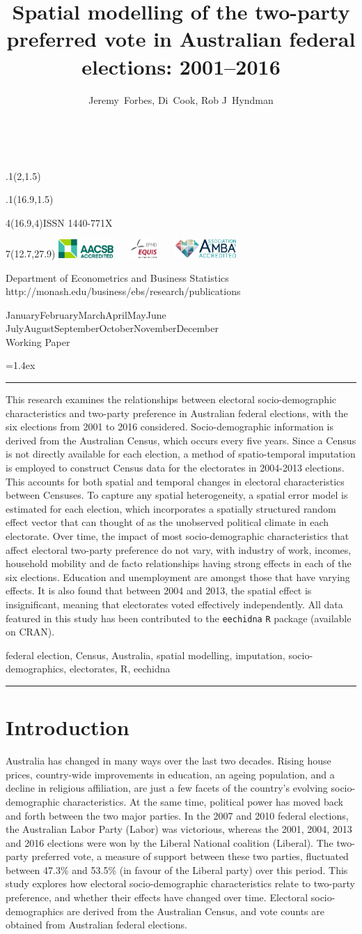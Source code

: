 \documentclass[11pt,a4paper,]{article}
\title{Spatial modelling of the two-party preferred vote in Australian federal elections: 2001--2016}
\author{Jeremy~Forbes, Di~Cook, Rob J~Hyndman}
\date{\sf\Date~\Month~\Year}
\makeatletter
\def\Date{\number\day}
\def\Month{\ifcase\month\or
 January\or February\or March\or April\or May\or June\or
 July\or August\or September\or October\or November\or December\fi}
\def\Year{\number\year}
\def\showjel{{\large\textsf{\textbf{JEL classification:}}~\@jel}}
\def\cover{{\sffamily\setcounter{page}{0}
        \thispagestyle{empty}
        \placefig{2}{1.5}{width=5cm}{monash2}
        \placefig{16.9}{1.5}{width=2.1cm}{MBusSchool}
        \begin{textblock}{4}(16.9,4)ISSN 1440-771X\end{textblock}
        \begin{textblock}{7}(12.7,27.9)\hfill
        \includegraphics[height=0.7cm]{AACSB}~~~
        \includegraphics[height=0.7cm]{EQUIS}~~~
        \includegraphics[height=0.7cm]{AMBA}
        \end{textblock}
        \vspace*{2cm}
        \begin{center}\Large
        Department of Econometrics and Business Statistics\\[.5cm]
        \footnotesize http://monash.edu/business/ebs/research/publications
        \end{center}\vspace{2cm}
        \begin{center}
        \fbox{\parbox{14cm}{\begin{onehalfspace}\centering\Huge\vspace*{0.3cm}
                \textsf{\textbf{\expandafter{\@title}}}\vspace{1cm}\par
                \LARGE\@author\end{onehalfspace}
        }}
        \end{center}
        \vfill
                \begin{center}\Large
                \Month~\Year\\[1cm]
                Working Paper \@wp
        \end{center}\vspace*{2cm}}}
\def\pageone{{\sffamily\setstretch{1}%
        \thispagestyle{empty}%
        \vbox to \textheight{%
        \raggedright\baselineskip=1.2cm
     {\fontsize{24.88}{30}\sffamily\textbf{\expandafter{\@title}}}
        \vspace{2cm}\par
        \hspace{1cm}\parbox{14cm}{\sffamily\large\@addresses}\vspace{1cm}\vfill
        \hspace{1cm}{\large\Date~\Month~\Year}\\[1cm]
        \hspace{1cm}\showjel\vss}}}
\def\blindtitle{{\sffamily
     \thispagestyle{plain}\raggedright\baselineskip=1.2cm
     {\fontsize{24.88}{30}\sffamily\textbf{\expandafter{\@title}}}\vspace{1cm}\par
        }}
\def\titlepage{{\cover\newpage\pageone\newpage\blindtitle}}
\let\maketitle\titlepage
\newenvironment{keywords}{\par\vspace{0.5cm}\noindent{\sffamily\textbf{Keywords:}}}{\vspace{0.25cm}\par\hrule\vspace{0.5cm}\par}
\renewenvironment{abstract}{\begin{minipage}{\textwidth}\parskip=1.4ex\noindent
\hrule\vspace{0.1cm}\par{\sffamily\textbf{\abstractname}}\newline}
  {\end{minipage}}
\def\placefig#1#2#3#4{\begin{textblock}{.1}(#1,#2)\rlap{\texttt{[image: \#4]}}\end{textblock}}
\makeatother
\begin{document}
\maketitle
\begin{abstract}
This research examines the relationships between electoral socio-demographic characteristics and two-party preference in Australian federal elections, with the six elections from 2001 to 2016 considered. Socio-demographic information is derived from the Australian Census, which occurs every five years. Since a Census is not directly available for each election, a method of spatio-temporal imputation is employed to construct Census data for the electorates in 2004-2013 elections. This accounts for both spatial and temporal changes in electoral characteristics between Censuses. To capture any spatial heterogeneity, a spatial error model is estimated for each election, which incorporates a spatially structured random effect vector that can thought of as the unobserved political climate in each electorate. Over time, the impact of most socio-demographic characteristics that affect electoral two-party preference do not vary, with industry of work, incomes, household mobility and de facto relationships having strong effects in each of the six elections. Education and unemployment are amongst those that have varying effects. It is also found that between 2004 and 2013, the spatial effect is insignificant, meaning that electorates voted effectively independently. All data featured in this study has been contributed to the \texttt{eechidna} \texttt{R} package (available on CRAN).
\end{abstract}
\begin{keywords}
federal election, Census, Australia, spatial modelling, imputation, socio-demographics, electorates, R, eechidna
\end{keywords}

\hypertarget{intro}{%
\section{Introduction}\label{intro}}

Australia has changed in many ways over the last two decades. Rising house prices, country-wide improvements in education, an ageing population, and a decline in religious affiliation, are just a few facets of the country's evolving socio-demographic characteristics. At the same time, political power has moved back and forth between the two major parties. In the 2007 and 2010 federal elections, the Australian Labor Party (Labor) was victorious, whereas the 2001, 2004, 2013 and 2016 elections were won by the Liberal National coalition (Liberal). The two-party preferred vote, a measure of support between these two parties, fluctuated between 47.3\% and 53.5\% (in favour of the Liberal party) over this period. This study explores how electoral socio-demographic characteristics relate to two-party preference, and whether their effects have changed over time. Electoral socio-demographics are derived from the Australian Census, and vote counts are obtained from Australian federal elections.
\end{document}
